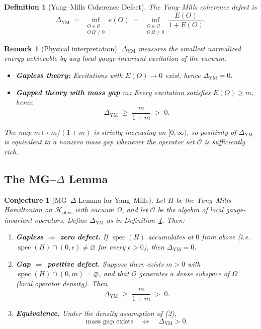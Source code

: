 \documentclass[11pt]{article}
\newtheorem{definition}[theorem]{Definition}
\newtheorem{remark}[theorem]{Remark}
\newtheorem{conjecture}[theorem]{Conjecture}
\DeclareMathOperator{\spec}{spec}
\begin{document}
\begin{definition}[Yang--Mills Coherence Defect]
\label{def:delta-ym}
The \emph{Yang--Mills coherence defect} is
\[
  \boxed{\;
  \Delta_{\mathrm{YM}}
  \;=\;
  \inf_{\substack{O \in \mathcal{O} \\[2pt] O\,\Omega \neq 0}}
  e(O)
  \;=\;
  \inf_{\substack{O \in \mathcal{O} \\[2pt] O\,\Omega \neq 0}}
  \frac{E(O)}{1 + E(O)} .
  \;}
\]
\end{definition}

\begin{remark}[Physical interpretation]
\label{rem:delta-interpretation}
$\Delta_{\mathrm{YM}}$ measures the smallest normalized energy
achievable by \emph{any} local gauge-invariant excitation of the
vacuum.
\begin{itemize}
\item \textbf{Gapless theory:}
      Excitations with $E(O) \to 0$ exist, hence
      $\Delta_{\mathrm{YM}} = 0$.
\item \textbf{Gapped theory with mass gap $m$:}
      Every excitation satisfies $E(O) \geq m$, hence
      \[
        \Delta_{\mathrm{YM}}
        \;\geq\;
        \frac{m}{1+m}
        \;>\; 0 .
      \]
\end{itemize}
The map $m \mapsto m/(1+m)$ is strictly increasing on
$[0,\infty)$, so positivity of $\Delta_{\mathrm{YM}}$ is
\emph{equivalent} to a nonzero mass gap whenever the operator set
$\mathcal{O}$ is sufficiently rich.
\end{remark}

\subsection{The MG--$\Delta$ Lemma}

\begin{conjecture}[MG--$\Delta$ Lemma for Yang--Mills]
\label{conj:mg-delta}
Let $H$ be the Yang--Mills Hamiltonian on
$\mathcal{H}_{\mathrm{phys}}$ with vacuum $\Omega$, and let
$\mathcal{O}$ be the algebra of local gauge-invariant operators.
Define $\Delta_{\mathrm{YM}}$ as in
Definition~\ref{def:delta-ym}.  Then:
\begin{enumerate}
\item[\textup{(1)}] \textbf{Gapless $\Rightarrow$ zero defect.}\;
      If\/ $\spec(H)$ accumulates at $0$ from above
      (i.e.\ $\spec(H) \cap (0,\epsilon) \neq \varnothing$ for every
      $\epsilon > 0$), then $\Delta_{\mathrm{YM}} = 0$.
\item[\textup{(2)}] \textbf{Gap $\Rightarrow$ positive defect.}\;
      Suppose there exists $m > 0$ with
      $\spec(H) \cap (0,m) = \varnothing$, and that $\mathcal{O}$
      generates a dense subspace of\/ $\Omega^{\perp}$
      (local operator density).  Then
      \[
        \Delta_{\mathrm{YM}}
        \;\geq\;
        \frac{m}{1+m}
        \;>\; 0 .
      \]
\item[\textup{(3)}] \textbf{Equivalence.}\;
      Under the density assumption of\/ \textup{(2)},
      \[
        \text{mass gap exists}
        \quad\Longleftrightarrow\quad
        \Delta_{\mathrm{YM}} > 0 .
      \]
\end{enumerate}
\end{conjecture}
\end{document}

